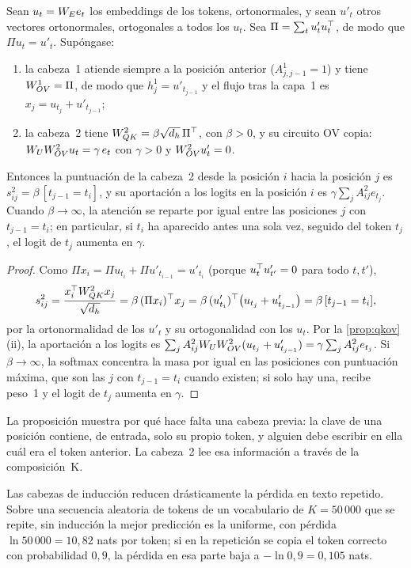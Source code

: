 \begin{proposicion}\label{prop:induccion}
Sean $u_t=W_{E} e_t$ los embeddings de los tokens, ortonormales, y sean $u'_t$ otros vectores ortonormales, ortogonales a todos los $u_t$. Sea $\Pi=\sum_tu'_tu_t^{\top}$, de modo que $\Pi u_t=u'_t$. Supóngase:
\begin{enumerate}
  \item la cabeza~1 atiende siempre a la posición anterior ($A^{1}_{j,j-1}=1$) y tiene $W_{OV}^{1}=\Pi$, de modo que $h^{1}_j=u'_{t_{j-1}}$ y el flujo tras la capa~1 es $x_j=u_{t_j}+u'_{t_{j-1}}$;
  \item la cabeza~2 tiene $W_{QK}^{2}=\beta\sqrt{d_h}\,\Pi^{\top}$, con $\beta>0$, y su circuito OV copia: $W_{U}W_{OV}^{2}u_t=\gamma\,e_t$ con $\gamma>0$ y $W_{OV}^{2}u'_t=0$.
\end{enumerate}
Entonces la puntuación de la cabeza~2 desde la posición $i$ hacia la posición $j$ es $s^{2}_{ij}=\beta\,[t_{j-1}=t_i]$, y su aportación a los logits en la posición $i$ es $\gamma\sum_jA^{2}_{ij}e_{t_j}$. Cuando $\beta\to\infty$, la atención se reparte por igual entre las posiciones $j$ con $t_{j-1}=t_i$; en particular, si $t_i$ ha aparecido antes una sola vez, seguido del token $t_j$, el logit de $t_j$ aumenta en $\gamma$.
\end{proposicion}

\begin{proof}
Como $\Pi x_i=\Pi u_{t_i}+\Pi u'_{t_{i-1}}=u'_{t_i}$ (porque $u_t^{\top} u'_{t'}=0$ para todo $t,t'$),
\[
s^{2}_{ij}=\frac{x_i^{\top}W_{QK}^{2}x_j}{\sqrt{d_h}}=\beta\,(\Pi x_i)^{\top} x_j=\beta\,(u'_{t_i})^{\top}\bigl(u_{t_j}+u'_{t_{j-1}}\bigr)=\beta\,[t_{j-1}=t_i],
\]
por la ortonormalidad de los $u'_t$ y su ortogonalidad con los $u_t$. Por la \cref{prop:qkov}(ii), la aportación a los logits es $\sum_jA^{2}_{ij}W_{U}W_{OV}^{2}(u_{t_j}+u'_{t_{j-1}})=\gamma\sum_jA^{2}_{ij}e_{t_j}$. Si $\beta\to\infty$, la softmax concentra la masa por igual en las posiciones con puntuación máxima, que son las $j$ con $t_{j-1}=t_i$ cuando existen; si solo hay una, recibe peso~1 y el logit de $t_j$ aumenta en $\gamma$.
\end{proof}

La proposición muestra por qué hace falta una cabeza previa: la clave de una posición contiene, de entrada, solo su propio token, y alguien debe escribir en ella cuál era el token anterior. La cabeza~2 lee esa información a través de la composición~K.

Las cabezas de inducción reducen drásticamente la pérdida en texto repetido. Sobre una secuencia aleatoria de tokens de un vocabulario de $K=50\,000$ que se repite, sin inducción la mejor predicción es la uniforme, con pérdida $\ln 50\,000=10{,}82$ nats por token; si en la repetición se copia el token correcto con probabilidad $0{,}9$, la pérdida en esa parte baja a $-\ln 0{,}9=0{,}105$ nats.

